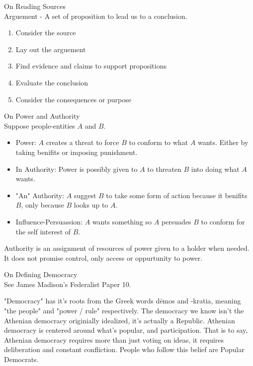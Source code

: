 \documentclass{article}
\begin{document}
\noindent
\Large
On Reading Sources\\
\normalsize
\noindent
Arguement - A set of proposition to lead us to a conclusion.

\begin{enumerate}
  \item Consider the source
  \item Lay out the arguement
  \item Find evidence and claims to support propositions
  \item Evaluate the conclusion
  \item Consider the consequences or purpose
\end{enumerate}

\noindent
\Large On Power and Authority\\
\normalsize
\noindent
Suppose people-entities $A$ and $B$.

\centering
{}
\raggedright

\begin{itemize}
  \item Power: $A$ creates a threat to force $B$ to conform to what $A$ wants. Either by taking benifits or imposing punishment.
  \item In Authority: Power is possibly given to $A$ to threaten $B$ into doing what $A$ wants.
  \item "An" Authority: $A$ suggest $B$ to take some form of action because it benifits $B$, only because $B$ looks up to $A$.
  \item Influence-Persuassion: $A$ wants something so $A$ persuades $B$ to conform for the self interest of $B$.
\end{itemize}

\noindent
Authority is an assignment of resources of power given to a holder when needed. It does not promise control, only access or oppurtunity to power.

\noindent
\Large
On Defining Democracy\\
\normalsize
\noindent
See James Madison's Federalist Paper 10.

\indent
"Democracy" has it's roots from the Greek words d\={e}mos and -kratia, meaning "the people" and "power / rule" respectively. The democracy we know isn't the Athenian democracy originially idealized, it's actually a Republic. Athenian democracy is centered around what's popular, and participation. That is to say, Athenian democracy requires more than just voting on ideas, it requires deliberation and constant confliction. People who follow this belief are Popular Democrats.\\
\end{document}
